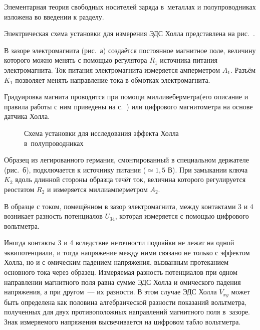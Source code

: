 \newpage
{}



Элементарная теория свободных носителей заряда в~металлах и полупроводниках изложена во введении к разделу.

\experiment Электрическая схема установки для измерения ЭДС Холла представлена на рис.~.

В зазоре электромагнита (рис.~а) создаётся постоянное магнитное поле, величину которого можно менять с помощью регулятора $R_1$ источника питания электромагнита. Ток питания электромагнита измеряется амперметром $A_1$. Разъём $K_1$ позволяет менять направление тока в обмотках электромагнита.

Градуировка магнита проводится при помощи милливеберметра(его описание и правила работы с ним приведены на с.~\pageref{MWB}) или цифрового магнитометра на основе датчика Холла.
\begin{figure}[h!]
	\caption{Схема установки для исследования эффекта Холла в~полупроводниках}
\end{figure}

Образец из легированного германия, смонтированный в специальном держателе (рис.~б), подключается к источнику питания ($\simeq 1,5$ В). При замыкании ключа $K_2$ вдоль длинной стороны образца течёт ток, величина которого регулируется реостатом $R_2$ и измеряется миллиамперметром $A_2$.

В образце с током, помещённом в зазор электромагнита, между контактами 3 и 4 возникает разность потенциалов $U_{34}$, которая измеряется с помощью цифрового вольтметра.

Иногда контакты 3 и 4 вследствие неточности подпайки не лежат на одной эквипотенциали, и тогда напряжение между ними связано не только с эффектом Холла, но и с омическим падением напряжения, вызванным протеканием основного тока  через образец. Измеряемая разность потенциалов при одном направлении магнитного поля равна сумме ЭДС Холла и омического падения напряжения, а при другом~--- их разности. В этом случае ЭДС Холла $V_{xy}$ может быть определена как половина алгебраической разности показаний вольтметра, полученных для двух противоположных направлений магнитного поля в~зазоре. Знак измеряемого напряжения высвечивается на цифровом табло вольтметра.

